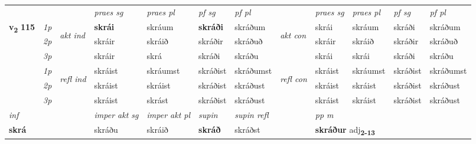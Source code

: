 \begin{longtable}[l]{X>{\footnotesize\itshape}llXXXXlXXXX}
 & &   & \textit{praes sg}  & \textit{praes pl}    & \textit{ pf sg} & \textit{pf pl} & & \textit{praes sg}  & \textit{praes pl}    & \textit{pf sg} & \textit{pf pl }  \\ \cmidrule{4-7} \cmidrule{9-12}
 \multirow{2}{*}{{{\textbf{v{\textsubscript{2}}} \Large{\textbf{115}}}}}  & 1p & \multirow{3}{*}{\begin{turn}{90}\textit{akt ind}\end{turn}} & \textbf{skrái} & skráum & \textbf{skráði} & skráðum & \multirow{3}{*}{\begin{turn}{90}\textit{akt con}\end{turn}} &skrái & skráum & skráði & skráðum\\*
 & 2p &  &  skráir  & skráið & skráðir & skráðuð & & skráir & skráið & skráðir & skráðuð \\*
 & 3p &  & skráir & skrá & skráði & skráðu & & skrái & skrái& skráði & skráðu \\*
\cmidrule{4-7} \cmidrule{9-12}
 & 1p & \multirow{3}{*}{\begin{turn}{90}\textit{refl ind}\end{turn}}  & skráist & skráumst & skráðist & skráðumst & \multirow{3}{*}{\begin{turn}{90}\textit{refl con}\end{turn}}  &skráist & skráumst & skráðist & skráðumst \\*
 & 2p &  & skráist & skráist & skráðist & skráðust & &skráist & skráist & skráðist & skráðust \\*
 & 3p  & & skráist & skrást & skráðist & skráðust & & skráist & skráist& skráðist & skráðust \\*
\cmidrule{4-7} \cmidrule{9-12}

   {\textit{inf}} & &  & \textit{imper akt sg} & \textit{imper akt pl}    & \textit{supin} & \textit{supin refl} && \textit{pp m} \\*
  {\textbf{skrá}} & && skráðu  & skráið    &  \textbf{skráð} & skráðst && \multicolumn{2}{l}{\textbf{skráður} adj\textbf{\textsubscript{2-13}}} \\*

\midrule


\end{longtable}
